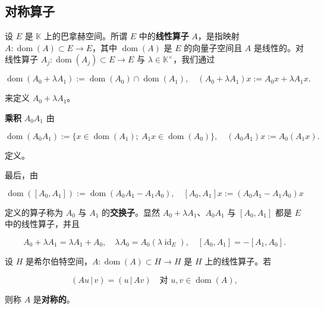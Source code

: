 \subsection*{对称算子}

设 $ E $ 是 $ \mathbb{K} $ 上的巴拿赫空间。所谓 $ E $ 中的\textbf{线性算子} $ A $，是指映射 $ A: \operatorname{dom}(A) \subset E \to E $，其中 $ \operatorname{dom}(A) $ 是 $ E $ 的向量子空间且 $ A $ 是线性的。对线性算子 $ A_j: \operatorname{dom}(A_j) \subset E \to E $ 与 $ \lambda \in \mathbb{K}^{\times} $，我们通过

\[
\operatorname{dom}(A_0 + \lambda A_1) := \operatorname{dom}(A_0) \cap \operatorname{dom}(A_1) , \quad (A_0 + \lambda A_1)x := A_0 x + \lambda A_1 x .
\]

来定义 $ A_0 + \lambda A_1 $。

\textbf{乘积} $ A_0A_1 $ 由

\[
\operatorname{dom}(A_0A_1) := \{ x \in \operatorname{dom}(A_1) ;\ A_1x \in \operatorname{dom}(A_0) \} , \quad (A_0A_1)x := A_0(A_1x) .
\]

定义。

最后，由

\[
\operatorname{dom}([A_0,A_1]) := \operatorname{dom}(A_0A_1 - A_1A_0) , \quad [A_0,A_1]x := (A_0A_1 - A_1A_0)x
\]

定义的算子称为 $ A_0 $ 与 $ A_1 $ 的\textbf{交换子}。显然 $ A_0 + \lambda A_1 $、$ A_0A_1 $ 与 $ [A_0,A_1] $ 都是 $ E $ 中的线性算子，并且

\[
A_0 + \lambda A_1 = \lambda A_1 + A_0 , \quad \lambda A_0 = A_0(\lambda \operatorname{id}_E) , \quad [A_0,A_1] = -[A_1,A_0] .
\]

设 $ H $ 是希尔伯特空间，$ A: \operatorname{dom}(A) \subset H \to H $ 是 $ H $ 上的线性算子。若

\[
(Au\,|\,v) = (u\,|\,Av) \quad \text{对 } u, v \in \operatorname{dom}(A) ,
\]

则称 $ A $ 是\textbf{对称的}。

